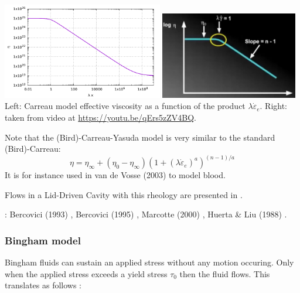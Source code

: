 \begin{center}
\includegraphics[width=7cm]{images/rheology/carreau/carreau.pdf}
\includegraphics[width=6cm]{images/rheology/carreau/carreau1}\\
{\captionfont Left: Carreau model effective viscosity as a function of 
the product $\lambda \dot{\varepsilon}_{e}$. Right: taken from 
video at \url{https://youtu.be/qErs5zZV4BQ}.}
\end{center}

Note that the (Bird)-Carreau-Yasuda model \cite{yaac81,osru14} is very similar to the standard (Bird)-Carreau:
\begin{equation}
\eta = \eta_\infty + (\eta_0-\eta_\infty) \left(1 + (\lambda \dot{\varepsilon}_{e})^a \right)^{(n-1)/a}
\end{equation}
It is for instance used in van de Vosse \etal (2003) \cite{vadv03} to model blood.

Flows in a Lid-Driven Cavity with this rheology are presented in \cite{zifr07,shal09}.

\Literature: Bercovici (1993) \cite{berc93}, Bercovici (1995) \cite{berc95},
Marcotte (2000) \cite{marc00}, Huerta \& Liu (1988) \cite{huli88}.

\subsubsection{Bingham model} \label{sec:bingham}

Bingham \cite{bingham} fluids can sustain an applied stress without any motion occuring. Only when the applied stress exceeds
a yield stress $\tau_0$ then the fluid flows. This translates as follows \cite{reddybook2}:

